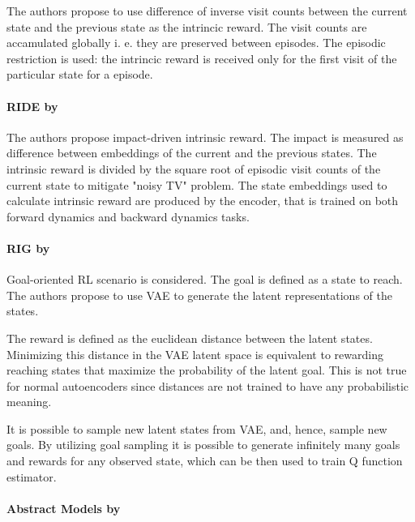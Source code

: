 \documentclass[acmsmall, nonacm]{acmart}
\begin{document}
The authors propose to use difference of inverse visit counts between the current state and the previous state as the intrincic reward. The visit counts are accamulated globally i. e. they are preserved between episodes. The episodic restriction is used: the intrincic reward is received only for the first visit of the particular state for a episode.


\paragraph{RIDE by \citet{Raileanu2020RIDERI}}

The authors propose impact-driven intrinsic reward. The impact is measured as difference between embeddings of the current and the previous states. The intrinsic reward is divided by the square root of episodic visit counts of the current state to mitigate "noisy TV" problem. The state embeddings used to calculate intrinsic reward are produced by the encoder, that is trained on both forward dynamics and backward dynamics tasks.


\paragraph{RIG by \citet{Nair2018VisualRL}}

Goal-oriented RL scenario is considered. The goal is defined as a state to reach. The authors propose to use VAE to generate the latent representations of the states.

The reward is defined as the euclidean distance between the latent states. Minimizing this distance in the VAE latent space is equivalent to rewarding reaching states that maximize the probability of the latent goal. This is not true for normal autoencoders since distances are not trained to have any probabilistic meaning.

It is possible to sample new latent states from VAE, and, hence, sample new goals. By utilizing goal sampling it is possible to generate infinitely many goals and rewards for any observed state, which can be then used to train Q function estimator.


\paragraph{Abstract Models by \citet{liu_learning_2018}}
\end{document}

